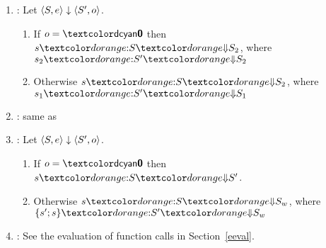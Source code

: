 \begin{enumerate}
\begin{enumerate}
\begin{itemize}
      \end{itemize}
    \item {}: Let $\langle S, e \rangle \downarrow \langle S', o \rangle$.
      \begin{enumerate}
        \item If $o = \Vint{0}$ then $\SEVAL{s}{S}{S_2}$, where $\SEVAL{s_2}{S'}{S_2}$
        \item Otherwise $\SEVAL{s}{S}{S_2}$, where $\SEVAL{s_1}{S'}{S_1}$
      \end{enumerate}
    \item {}: same as 
    \item {}: Let $\langle S, e \rangle \downarrow \langle S', o \rangle$.
      \begin{enumerate}
        \item If $o = \Vint{0}$ then $\SEVAL{s}{S}{S'}$.
        \item Otherwise $\SEVAL{s}{S}{S_w}$, where $\SEVAL{\{ s'; s \}}{S'}{S_w}$
      \end{enumerate}
    \item {}: See the evaluation of function calls in Section~\ref{eeval}.
  \end{enumerate}
\end{enumerate}






